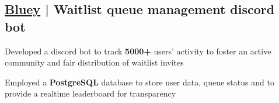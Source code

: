 \vspace{0.3cm}\subsection{\href{https://github.com/arian81/bluey}{Bluey} | Waitlist queue management discord bot }
\begin{zitemize}
    \item Developed a discord bot to track \textbf{5000+} users' activity to foster an active community and fair distribution of waitlist invites
    \item Employed a \textbf{PostgreSQL} database to store user data, queue status and to provide a realtime leaderboard for transparency
\end{zitemize}